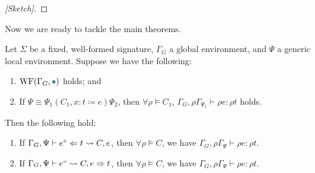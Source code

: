 \begin{proof}[{[Sketch]}]
\end{proof}


Now we are ready to tackle the main theorems.

\begin{theorem}\label{thm:soundness}
Let $\Sigma$ be a fixed, well-formed signature, $\Gamma_G$ a global environment, and $\Psi$ a generic local environment.
Suppose we have the following:
\begin{enumerate}[label=\roman*.]
  \item \label{item:sound:wf:global} $\WF{\Gamma_G, \mt}$ holds; and
  \item \label{item:sound:psi} If $\Psi \equiv \Psi_1 (C_1, x : t \coloneqq e) \Psi_2$, then
    $\forall \rho \vDash C_1$, $\Gamma_G, \rho \Gamma_{\Psi_1} \vdash \rho e : \rho t$ holds.
\end{enumerate}
Then the following hold:
\begin{enumerate}
  \item If $\Gamma_G, \Psi \vdash e^\circ \Leftarrow t \rightsquigarrow C, e$,
  then $\forall \rho \vDash C$, we have $\Gamma_G, \rho\Gamma_\Psi \vdash \rho e : \rho t$.
  \item If $\Gamma_G, \Psi \vdash e^\circ \rightsquigarrow C, e \Rightarrow t$,
  then $\forall \rho \vDash C$, we have $\Gamma_G, \rho\Gamma_\Psi \vdash \rho e : \rho t$.
\end{enumerate}
\end{theorem}

